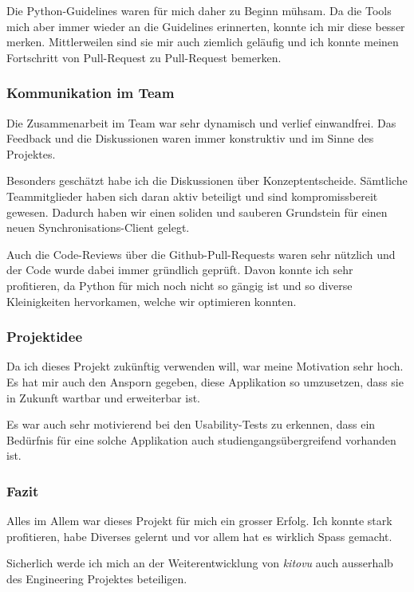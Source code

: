\documentclass[a4paper]{article}
\begin{document}
Die Python-Guidelines waren für mich daher zu Beginn mühsam.
Da die Tools mich aber immer wieder an die Guidelines erinnerten, konnte ich mir diese besser merken.
Mittlerweilen sind sie mir auch ziemlich geläufig und ich konnte meinen Fortschritt von Pull-Request zu Pull-Request bemerken.

\subsubsection{Kommunikation im Team}

Die Zusammenarbeit im Team war sehr dynamisch und verlief einwandfrei.
Das Feedback und die Diskussionen waren immer konstruktiv und im Sinne des Projektes.

Besonders geschätzt habe ich die Diskussionen über Konzeptentscheide.
Sämtliche Teammitglieder haben sich daran aktiv beteiligt und sind kompromissbereit gewesen.
Dadurch haben wir einen soliden und sauberen Grundstein für einen neuen Synchronisations-Client gelegt.

Auch die Code-Reviews über die Github-Pull-Requests waren sehr nützlich und der Code wurde dabei immer gründlich geprüft.
Davon konnte ich sehr profitieren, da Python für mich noch nicht so gängig ist und so diverse Kleinigkeiten hervorkamen, welche wir optimieren konnten.

\subsubsection{Projektidee}

Da ich dieses Projekt zukünftig verwenden will, war meine Motivation sehr hoch.
Es hat mir auch den Ansporn gegeben, diese Applikation so umzusetzen, dass sie in Zukunft wartbar und erweiterbar ist.

Es war auch sehr motivierend bei den Usability-Tests zu erkennen, dass ein Bedürfnis für eine solche Applikation auch studiengangsübergreifend vorhanden ist.

\subsubsection{Fazit}

Alles im Allem war dieses Projekt für mich ein grosser Erfolg.
Ich konnte stark profitieren, habe Diverses gelernt und vor allem hat es wirklich Spass gemacht.

Sicherlich werde ich mich an der Weiterentwicklung von \emph{kitovu} auch ausserhalb des Engineering Projektes beteiligen.
\end{document}
